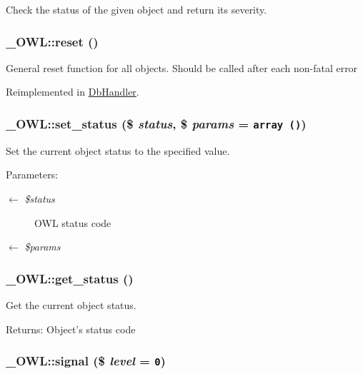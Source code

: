 Check the status of the given object and return its severity. \hypertarget{class__OWL_2f2a042bcf31965194c03033df0edc9b}{
\subsubsection{\setlength{\rightskip}{0pt plus 5cm}\_\-OWL::reset ()}}
\label{class__OWL_2f2a042bcf31965194c03033df0edc9b}


General reset function for all objects. Should be called after each non-fatal error 

Reimplemented in \hyperlink{classDbHandler_9982df4830f05803935bb31bac7fae3d}{DbHandler}.\hypertarget{class__OWL_ea912d0ede9b3c2a69b79072d94d4787}{
\subsubsection{\setlength{\rightskip}{0pt plus 5cm}\_\-OWL::set\_\-status (\$ {\em status}, \$ {\em params} = {\tt array~()})}}
\label{class__OWL_ea912d0ede9b3c2a69b79072d94d4787}


Set the current object status to the specified value.

\begin{Desc}
\item[Parameters:]
\begin{description}
\item[\mbox{$\leftarrow$} {\em \$status}]OWL status code \item[\mbox{$\leftarrow$} {\em \$params}]\end{description}
\end{Desc}
\hypertarget{class__OWL_99ec771fa2c5c279f80152cc09e489a8}{
\subsubsection{\setlength{\rightskip}{0pt plus 5cm}\_\-OWL::get\_\-status ()}}
\label{class__OWL_99ec771fa2c5c279f80152cc09e489a8}


Get the current object status.

\begin{Desc}
\item[Returns:]Object's status code \end{Desc}
\hypertarget{class__OWL_61c04b80fe17e2f1e339a6d6a89e45f3}{
\subsubsection{\setlength{\rightskip}{0pt plus 5cm}\_\-OWL::signal (\$ {\em level} = {\tt 0})}}
\label{class__OWL_61c04b80fe17e2f1e339a6d6a89e45f3}


